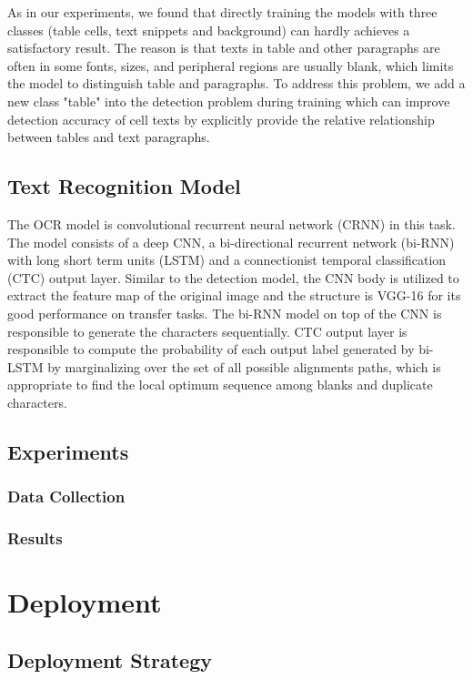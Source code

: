 \documentclass[sigconf]{acmart}
\begin{document}
As in our experiments, we found that directly training the models with three classes (table cells, text snippets and background) can hardly achieves a satisfactory result. The reason is that texts in table and other paragraphs are often in some fonts, sizes, and peripheral regions are usually blank, which limits the model to distinguish table and paragraphs. To address this problem, we add a new class "table" into the detection problem during training which can improve detection accuracy of cell texts by explicitly provide the relative relationship between tables and text paragraphs.

\subsection{Text Recognition Model}
The OCR model is convolutional recurrent neural network (CRNN) \cite{shi2017end} in this task. The model consists of a deep CNN, a bi-directional recurrent network (bi-RNN) with long short term units (LSTM) and a connectionist temporal classification (CTC) \cite{graves2006connectionist} output layer. Similar to the detection model, the CNN body is utilized to extract the feature map of the original image and the structure is VGG-16 for its good performance on transfer tasks. The bi-RNN model on top of the CNN is responsible to generate the characters sequentially. CTC output layer is responsible to compute the probability of each output label generated by bi-LSTM by marginalizing
over the set of all possible alignments paths, which is appropriate to find the local optimum sequence among blanks and duplicate characters.
\subsection{Experiments}

\subsubsection*{Data Collection}

\subsubsection*{Results}

\section{Deployment}
\subsection{Deployment Strategy}
\end{document}
